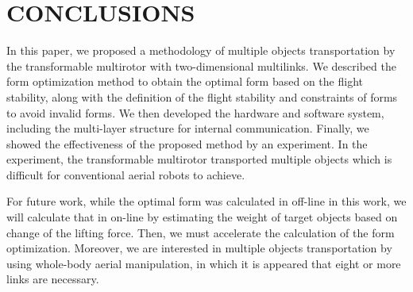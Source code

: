 \section{CONCLUSIONS}
In this paper, we proposed a methodology of multiple objects transportation by the transformable multirotor with two-dimensional multilinks. We described the form optimization method to obtain the optimal form based on the flight stability, along with the definition of the flight stability and constraints of forms to avoid invalid forms. We then developed the hardware and software system, including the multi-layer structure for internal communication. Finally, we showed the effectiveness of the proposed method by an experiment. In the experiment, the transformable multirotor transported multiple objects which is difficult for conventional aerial robots to achieve.
\par
For future work, while the optimal form was calculated in off-line in this work, we will calculate that in on-line by estimating the weight of target objects based on change of the lifting force. Then, we must accelerate the calculation of the form optimization. Moreover, we are interested in multiple objects transportation by using whole-body aerial manipulation\cite{ZhaoICRA2017}, in which it is appeared that eight or more links are necessary.
